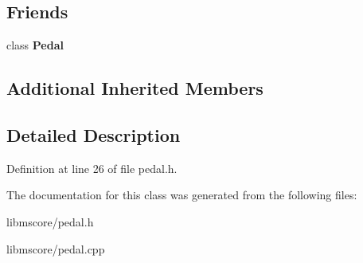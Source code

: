 \subsection*{Friends}
\begin{DoxyCompactItemize}
\item 
\mbox{\label{class_ms_1_1_pedal_segment_aee60f7c606e6e22e077d259e15a5ec71}} 
class {\bfseries Pedal}
\end{DoxyCompactItemize}
\subsection*{Additional Inherited Members}


\subsection{Detailed Description}


Definition at line 26 of file pedal.\+h.



The documentation for this class was generated from the following files\+:\begin{DoxyCompactItemize}
\item 
libmscore/pedal.\+h\item 
libmscore/pedal.\+cpp\end{DoxyCompactItemize}
